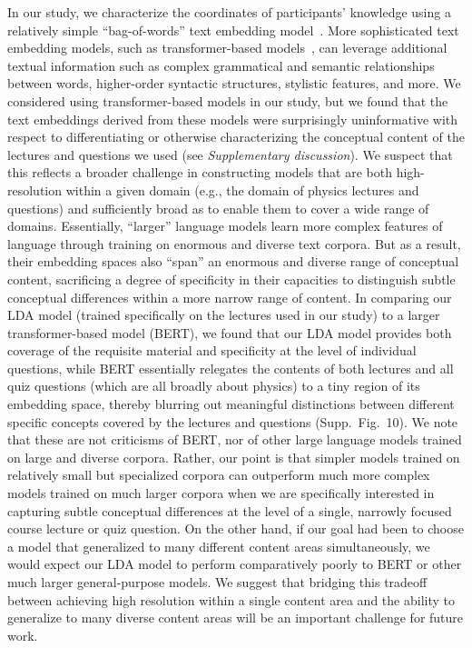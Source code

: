 \documentclass[10pt]{article}
\newcommand{\ldaVsBERT}{10}
\newcommand{\suppDiscussion}{\textit{Supplementary discussion}}
\begin{document}
In our study, we characterize the coordinates of participants' knowledge
using a relatively simple ``bag-of-words'' text embedding model~\citep[LDA;
][]{BleiEtal03}. More sophisticated text embedding models, such as
transformer-based models~\citep{ViswEtal17, DevlEtal18, ChatGPT, TouvEtal23},
can leverage additional textual information such as complex grammatical and
semantic relationships between words, higher-order syntactic structures,
stylistic features, and more. We considered using transformer-based models in
our study, but we found that the text embeddings derived from these models were
surprisingly uninformative with respect to differentiating or otherwise
characterizing the conceptual content of the lectures and questions we used
(see \suppDiscussion). We suspect that this reflects a broader challenge in
constructing models that are both high-resolution within a given domain (e.g.,
the domain of physics lectures and questions) and sufficiently broad
as to enable them to cover a wide range of domains. Essentially,
``larger'' language models learn more complex features of language through
training on enormous and diverse text corpora. But as a result, their
embedding spaces also ``span'' an enormous and diverse range of conceptual
content, sacrificing a degree of specificity in their capacities to distinguish
subtle conceptual differences within a more narrow range of content.
In comparing our LDA model (trained specifically on the lectures used in our
study) to a larger transformer-based model (BERT), we found that our LDA model provides
both coverage of the requisite material and specificity at the level of
individual questions, while BERT essentially relegates the contents of both
lectures and all quiz questions (which are all broadly about physics) to a
tiny region of its embedding space, thereby blurring out meaningful distinctions
between different specific concepts covered by the lectures and questions
(Supp.~Fig.~\ldaVsBERT). We note that these are not criticisms of BERT, nor of
other large language models trained on large and diverse corpora. Rather, our
point is that simpler models trained on relatively small but specialized
corpora can outperform much more complex models trained on much larger corpora
when we are specifically interested in capturing subtle conceptual differences
at the level of a single, narrowly focused course lecture or quiz question. On the other hand, if
our goal had been to choose a model that generalized to many different content
areas simultaneously, we would expect our LDA model to perform comparatively poorly to BERT or
other much larger general-purpose models. We suggest that bridging this tradeoff
between achieving high resolution within a single content area and the ability to
generalize to many diverse content areas will be an important challenge for
future work.
\end{document}
